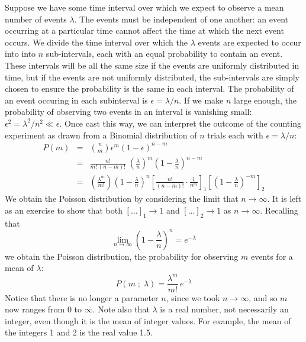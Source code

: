 \documentclass[12pt,oneside]{book}
\begin{document}
Suppose we have some time interval over which we expect to observe a
mean number of events $\lambda$.  The events must be independent of
one another: an event occurring at a particular time cannot affect the
time at which the next event occurs.  We divide the time interval over
which the $\lambda$ events are expected to occur into into $n$
sub-intervals, each with an equal probability to contain an event.
These intervals will be all the same size if the events are uniformly
distributed in time, but if the events are not uniformly distributed,
the sub-intervals are simply chosen to ensure the probability is the
same in each interval.  The probability of an event occuring in each
subinterval is $\epsilon = \lambda / n$.  If we make $n$ large enough,
the probability of observing two events in an interval is vanishing
small: $\epsilon^2 = \lambda^2 / n^2 \ll \epsilon$.  Once cast this way, we can
interpret the outcome of the counting experiment as drawn from a
Binomial distribution of $n$ trials each with $\epsilon = \lambda / n$:
\begin{eqnarray*}
P(m) &=& \binom{n}{m} \epsilon^m (1-\epsilon)^{n-m} \\[5pt]
  &=& \frac{n!}{m! \, (n-m)!} \; \left( \frac{\lambda}{n} \right)^m \left( 1 - \frac{\lambda}{n}\right)^{n-m} \\[5pt]
  &=& \left( \frac{\lambda^m}{m!} \right) \left(1-\frac{\lambda}{n} \right)^n \left[ \frac{n!}{(n-m)!} \cdot \frac{1}{n^m}\right]_1 \left[ \left( 1 - \frac{\lambda}{n}\right)^{-m}\right]_2
\end{eqnarray*}
We obtain the Poisson distribution by considering the limit that  $n \to \infty$.   It is left as an exercise to show that both $[\dots]_1 \to 1$ and $[\dots]_2 \to 1$ as $n \to \infty$.  Recalling that
\begin{displaymath}
\lim_{n \to \infty} \left(1 - \frac{\lambda}{n} \right)^n = e^{-\lambda}
\end{displaymath}
we obtain the Poisson distribution, the probability for observing $m$ events for a mean of $\lambda$:
\begin{equation}
\label{eqn:poisson}
P(m\; ; \; \lambda) = \frac{\lambda^m}{m!} \, e^{-\lambda}
\end{equation}
Notice that there is no longer a parameter $n$, since we took $n \to
\infty$, and so $m$ now ranges from 0 to $\infty$.  Note also that
$\lambda$ is a real number, not necessarily an integer, even though it
is the mean of integer values.  For example, the mean of the integers
1 and 2 is the real value 1.5.
\end{document}
